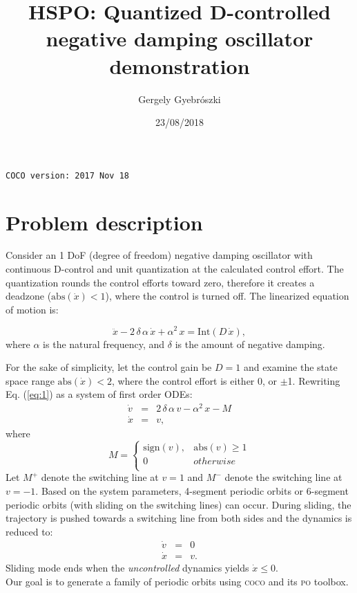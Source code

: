\documentclass{article}
\title{HSPO: Quantized D-controlled negative damping oscillator demonstration}
\date{23/08/2018}
\author{Gergely Gyebrószki}
\begin{document}
	
\maketitle

\noindent\texttt{COCO version: 2017 Nov 18}

\section{Problem description}

Consider an 1 DoF (degree of freedom) negative damping oscillator with continuous D-control and unit quantization at the calculated control effort. The quantization rounds the control efforts toward zero, therefore it creates a deadzone ($\mathrm{abs}(\dot{x})<1$), where the control is turned off.
The linearized equation of motion is:

\begin{equation}\label{eq:1}
	\ddot{x}-2\,\delta\,\alpha\,\dot{x}+\alpha^2\,x = \mathrm{Int}(D\,\dot{x}),
\end{equation}
where $\alpha$ is the natural frequency, and $\delta$ is the amount of negative damping.

For the sake of simplicity, let the control gain be $D=1$ and examine the state space range $\mathrm{abs}(\dot{x})<2$, where the control effort is either 0, or $\pm$1.
Rewriting Eq. (\ref{eq:1}) as a system of first order ODEs:
\begin{eqnarray}
\dot{v} &=& 2\,\delta\,\alpha\,v - \alpha^2\,x - M \\
\dot{x} &=& v, \nonumber
\end{eqnarray}
where
\begin{equation}
	M=
	\begin{cases}
	\mathrm{sign}(v), & \mathrm{abs}(v) \geq 1\\
	0 & otherwise\\
	\end{cases}
\end{equation}
Let $M^+$ denote the switching line at $v = 1$ and $M^-$ denote the switching line at $v = -1$.
Based on the system parameters, 4-segment periodic orbits or 6-segment periodic orbits (with sliding on the switching lines) can occur.
During sliding, the trajectory is pushed towards a switching line from both sides and the dynamics is reduced to:
\begin{eqnarray}
\dot{v} &=& 0\\
\dot{x} &=& v. \nonumber
\end{eqnarray}
Sliding mode ends when the \emph{uncontrolled} dynamics yields $\dot{x} \leq 0$.\\
Our goal is to generate a family of periodic orbits using \textsc{coco} and its \textsc{po} toolbox.
\end{document}
